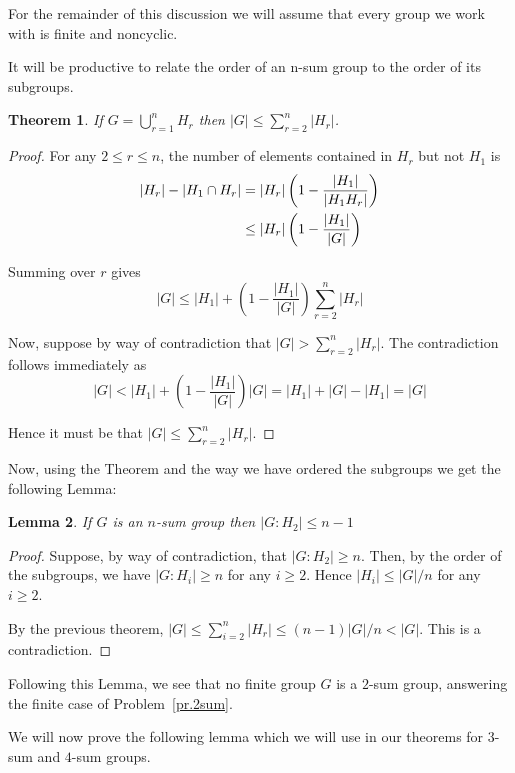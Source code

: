 \documentclass[12pt]{amsart}
\newtheorem{theorem}{Theorem}
\newtheorem{lemma}[theorem]{Lemma}
\theoremstyle{definition}
\theoremstyle{remark}
\begin{document}
For the remainder of this discussion we will assume that every group we work with is finite and noncyclic.

It will be productive to relate the order of an n-sum group to the order of its subgroups.

\begin{theorem}
\label{th.ineq}
If \(G = \bigcup_{r=1}^{n} H_r\) then \(|G| \leq \sum_{r=2}^{n} |H_r|\).
\end{theorem}
\begin{proof}
For any \(2 \leq r \leq n\), the number of elements contained in \(H_r\) but not \(H_1\) is
\begin{align}
	|H_{r}| - |H_{1} \cap H_{r}| &= |H_{r}| \left( 1 - \frac{|H_{1}|}{|H_{1}H_{r}|} \right) \notag\\
	&\leq |H_{r}| \left( 1 - \frac{|H_{1}|}{|G|} \right) \label{eq.ineq}
\end{align}

Summing over \(r\) gives
\[ |G| \leq |H_{1}| + \left( 1 - \frac{|H_{1}|}{|G|} \right) \sum_{r=2}^{n} |H_{r}|\]

Now, suppose by way of contradiction that \(|G| > \sum_{r=2}^{n} |H_{r}|\).  The contradiction follows immediately as
\[|G| < |H_{1}| + \left( 1 - \frac{|H_1|}{|G|} \right) |G| = |H_{1}| + |G| - |H_{1}| = |G|\]

Hence it must be that \(|G| \leq \sum_{r=2}^{n} |H_{r}|\).
\end{proof}

Now, using the Theorem and the way we have ordered the subgroups we get the following Lemma:

\begin{lemma}
\label{lm.ineq}
If \( G \) is an \( n \)-sum group then \(|G:H_2| \leq n - 1\)
\end{lemma}
\begin{proof}
Suppose, by way of contradiction, that \( |G:H_2| \geq n \).  Then, by the order of the subgroups, we have \( |G:H_i| \geq n \) for any \( i \geq 2 \).  Hence \( |H_i| \leq |G|/n \) for any \( i \geq 2 \).

By the previous theorem, \( |G| \leq \sum_{i=2}^n |H_r| \leq (n-1)|G|/n < |G| \).  This is a contradiction.
\end{proof}

Following this Lemma, we see that no finite group \( G \) is a \(2\)-sum group, answering the finite case of Problem~\ref{pr.2sum}.

We will now prove the following lemma which we will use in our theorems for \(3\)-sum and \(4\)-sum groups.
\end{document}
